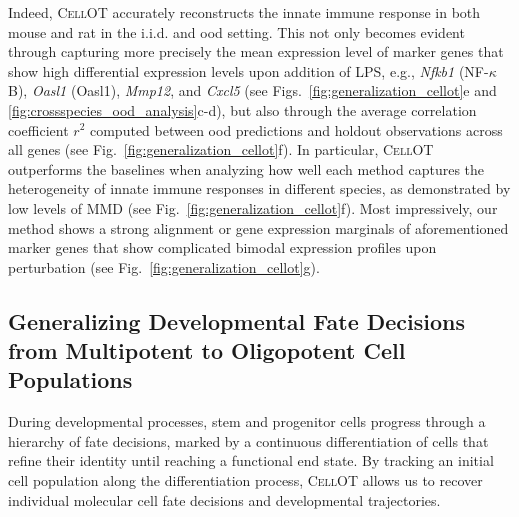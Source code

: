 Indeed, \textsc{CellOT} accurately reconstructs the innate immune response in both mouse and rat in the i.i.d. and \acrshort{ood} setting. This not only becomes evident through capturing more precisely the mean expression level of marker genes that show high differential expression levels upon addition of LPS, e.g., \textit{Nfkb1} (NF-$\kappa$B), \textit{Oasl1} (Oasl1), \textit{Mmp12}, and \textit{Cxcl5} (see Figs.~\ref{fig:generalization_cellot}e and \ref{fig:crossspecies_ood_analysis}c-d), but also through the average correlation coefficient $r^2$ computed between \acrshort{ood} predictions and holdout observations across all genes (see Fig.~\ref{fig:generalization_cellot}f).
In particular, \textsc{CellOT} outperforms the baselines when analyzing how well each method captures the heterogeneity of innate immune responses in different species, as demonstrated by low levels of \acrshort{MMD} (see Fig.~\ref{fig:generalization_cellot}f).
Most impressively, our method shows a strong alignment or gene expression marginals of aforementioned marker genes that show complicated bimodal expression profiles upon perturbation (see Fig.~\ref{fig:generalization_cellot}g).

\subsection{Generalizing Developmental Fate Decisions from Multipotent to Oligopotent Cell Populations}

 During developmental processes, stem and progenitor cells progress through a hierarchy of fate decisions, marked by a continuous differentiation of cells that refine their identity until reaching a functional end state.
By tracking an initial cell population along the differentiation process, \textsc{CellOT} allows us to recover individual molecular cell fate decisions and developmental trajectories. 

